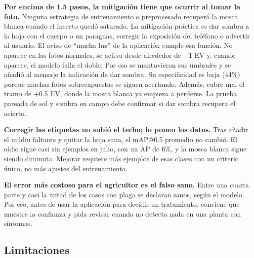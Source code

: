 \documentclass[sensors,article,submit,pdftex,moreauthors]{Definitions/mdpi}
\begin{document}
{\color{blue} \textbf{Por encima de 1.5 pasos, la mitigación tiene que ocurrir al tomar la foto.} Ninguna estrategia de entrenamiento o preprocesado recuperó la mosca blanca cuando el insecto quedó saturado.} {\color{blue} La mitigación práctica es dar sombra a la hoja con el cuerpo o un paraguas, corregir la exposición del teléfono o advertir al usuario.} {\color{blue} El aviso de ``mucha luz'' de la aplicación cumple esa función.} {\color{blue} No aparece en las fotos normales, se activa desde alrededor de +1 EV y, cuando aparece, el modelo falla el doble.} {\color{blue} Por eso se mantuvieron sus umbrales y se añadió al mensaje la indicación de dar sombra.} {\color{blue} Su especificidad es baja (44\%) porque muchas fotos sobreexpuestas se siguen acertando.} {\color{blue} Además, cubre mal el tramo de +0.5 EV, donde la mosca blanca ya empieza a perderse.} {\color{blue} La prueba pareada de sol y sombra en campo debe confirmar si dar sombra recupera el acierto.}

{\color{blue} \textbf{Corregir las etiquetas no subió el techo; lo ponen los datos.} Tras añadir el mildiu faltante y quitar la hoja sana, el mAP@0.5 promedio no cambió.} {\color{blue} El oídio sigue casi sin ejemplos en julio, con un AP de 6\%, y la mosca blanca sigue siendo diminuta.} {\color{blue} Mejorar requiere más ejemplos de esas clases con un criterio único, no más ajustes del entrenamiento.}

{\color{blue} \textbf{El error más costoso para el agricultor es el falso sano.} Entre una cuarta parte y casi la mitad de los casos con plaga se declaran sanos, según el modelo.} {\color{blue} Por eso, antes de usar la aplicación para decidir un tratamiento, conviene que muestre la confianza y pida revisar cuando no detecta nada en una planta con síntomas.}

\subsection{\color{blue} Limitaciones}\label{sec:limitaciones}
\end{document}
